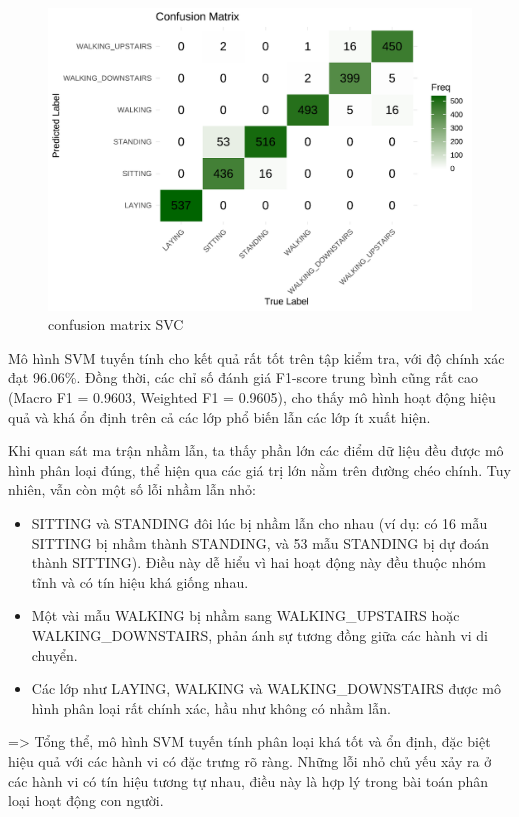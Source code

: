 \documentclass[
]{article}
\begin{document}
\begin{figure}
\centering
\includegraphics{report_files/figure-latex/unnamed-chunk-24-1.pdf}
\caption{confusion matrix SVC}
\end{figure}

Mô hình SVM tuyến tính cho kết quả rất tốt trên tập kiểm tra, với độ
chính xác đạt 96.06\%. Đồng thời, các chỉ số đánh giá F1-score trung
bình cũng rất cao (Macro F1 = 0.9603, Weighted F1 = 0.9605), cho thấy mô
hình hoạt động hiệu quả và khá ổn định trên cả các lớp phổ biến lẫn các
lớp ít xuất hiện.

Khi quan sát ma trận nhầm lẫn, ta thấy phần lớn các điểm dữ liệu đều
được mô hình phân loại đúng, thể hiện qua các giá trị lớn nằm trên đường
chéo chính. Tuy nhiên, vẫn còn một số lỗi nhầm lẫn nhỏ:

\begin{itemize}
\item
  SITTING và STANDING đôi lúc bị nhầm lẫn cho nhau (ví dụ: có 16 mẫu
  SITTING bị nhầm thành STANDING, và 53 mẫu STANDING bị dự đoán thành
  SITTING). Điều này dễ hiểu vì hai hoạt động này đều thuộc nhóm tĩnh và
  có tín hiệu khá giống nhau.
\item
  Một vài mẫu WALKING bị nhầm sang WALKING\_UPSTAIRS hoặc
  WALKING\_DOWNSTAIRS, phản ánh sự tương đồng giữa các hành vi di
  chuyển.
\item
  Các lớp như LAYING, WALKING và WALKING\_DOWNSTAIRS được mô hình phân
  loại rất chính xác, hầu như không có nhầm lẫn.
\end{itemize}

=\textgreater{} Tổng thể, mô hình SVM tuyến tính phân loại khá tốt và ổn
định, đặc biệt hiệu quả với các hành vi có đặc trưng rõ ràng. Những lỗi
nhỏ chủ yếu xảy ra ở các hành vi có tín hiệu tương tự nhau, điều này là
hợp lý trong bài toán phân loại hoạt động con người.
\end{document}
